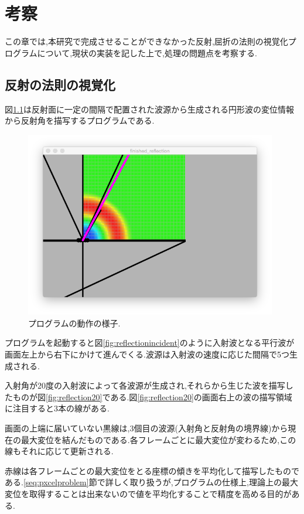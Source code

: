 

\chapter{考察}
\label{seq:considaration}
この章では,本研究で完成させることができなかった反射,屈折の法則の視覚化プログラムについて,現状の実装を記した上で,処理の問題点を考察する.

\section{反射の法則の視覚化}
\label{seq:reflection}
図\ref{fig:reflectionsetumei}は反射面に一定の間隔で配置された波源から生成される円形波の変位情報から反射角を描写するプログラムである.
\begin{figure}[H]
 \begin{center}
  \includegraphics[width=110mm]{../result/reflectionsetumei.png}
 \end{center}
 \caption{プログラムの動作の様子.}
 \label{fig:reflectionsetumei}
\end{figure}

プログラムを起動すると図\ref{fig:reflectionincident}のように入射波となる平行波が画面左上から右下にかけて進んでくる.波源は入射波の速度に応じた間隔で5つ生成される.

入射角が20度の入射波によって各波源が生成され,それらから生じた波を描写したものが図\ref{fig:reflection20}である.図\ref{fig:reflection20}の画面右上の波の描写領域に注目すると3本の線がある.

画面の上端に届いていない黒線は,3個目の波源(入射角と反射角の境界線)から現在の最大変位を結んだものである.各フレームごとに最大変位が変わるため,この線もそれに応じて更新される.

赤線は各フレームごとの最大変位をとる座標の傾きを平均化して描写したものである.\ref{seq:pxcelproblem}節で詳しく取り扱うが,プログラムの仕様上,理論上の最大変位を取得することは出来ないので値を平均化することで精度を高める目的がある.


